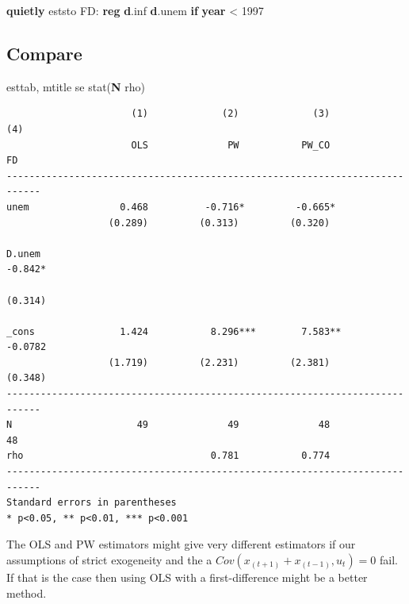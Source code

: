 \documentclass[
]{book}
\newenvironment{Shaded}{\begin{snugshade}}{\end{snugshade}}
\newcommand{\FunctionTok}[1]{\textcolor[rgb]{0.13,0.29,0.53}{\textbf{#1}}}
\newcommand{\KeywordTok}[1]{\textcolor[rgb]{0.13,0.29,0.53}{\textbf{#1}}}
\newcommand{\NormalTok}[1]{#1}
\begin{document}
\begin{Shaded}
\begin{Highlighting}[]
\KeywordTok{quietly}\NormalTok{ eststo FD: }\KeywordTok{reg} \KeywordTok{d}\NormalTok{.inf }\KeywordTok{d}\NormalTok{.unem }\KeywordTok{if} \FunctionTok{year}\NormalTok{ \textless{} 1997}
\end{Highlighting}
\end{Shaded}

\subsection*{Compare}\label{compare}

\begin{Shaded}
\begin{Highlighting}[]
\NormalTok{    esttab, mtitle se stat(}\KeywordTok{N}\NormalTok{ rho)}
\end{Highlighting}
\end{Shaded}

\begin{verbatim}
                      (1)             (2)             (3)             (4)   
                      OLS              PW           PW_CO              FD   
----------------------------------------------------------------------------
unem                0.468          -0.716*         -0.665*                  
                  (0.289)         (0.313)         (0.320)                   

D.unem                                                             -0.842*  
                                                                  (0.314)   

_cons               1.424           8.296***        7.583**       -0.0782   
                  (1.719)         (2.231)         (2.381)         (0.348)   
----------------------------------------------------------------------------
N                      49              49              48              48   
rho                                 0.781           0.774                   
----------------------------------------------------------------------------
Standard errors in parentheses
* p<0.05, ** p<0.01, *** p<0.001
\end{verbatim}

The OLS and PW estimators might give very different estimators if our
assumptions of strict exogeneity and the a \(Cov(x_(t+1)+x_(t-1),u_t)=0\)
fail. If that is the case then using OLS with a first-difference might be
a better method.
\end{document}

